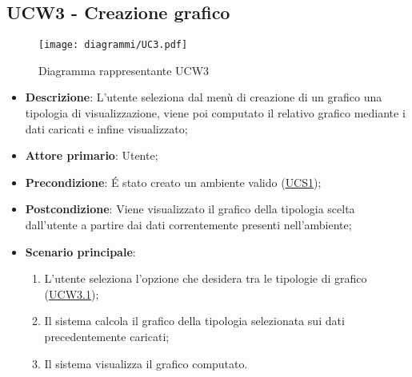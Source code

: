 \subsection{UCW3 - Creazione grafico}
\label{sub:ucw3}

\begin{figure}[h]
	\centering
	\texttt{[image: diagrammi/UC3.pdf]}
	\caption{Diagramma rappresentante UCW3}
	\label{fig:UCW3}
\end{figure}


\begin{itemize}
	\item \textbf{Descrizione}: L’utente seleziona dal menù di creazione di un grafico una tipologia di
	      visualizzazione, viene poi computato il relativo grafico mediante i dati caricati e infine visualizzato;

	\item \textbf{Attore primario}: Utente;

	\item \textbf{Precondizione}: É stato creato un ambiente valido (\hyperref[sub:ucs1]{UCS1});

	\item \textbf{Postcondizione}:  Viene visualizzato il grafico della tipologia scelta dall'utente a partire dai dati
	      correntemente presenti nell'ambiente;

	\item \textbf{Scenario principale}:
	      \begin{enumerate}
		      \item L'utente seleziona l'opzione che desidera tra le tipologie di grafico (\hyperref[ssub:ucw3.1]{UCW3.1});
		      \item Il sistema calcola il grafico della tipologia selezionata sui dati precedentemente caricati;
		      \item Il sistema visualizza il grafico computato.
	      \end{enumerate}
\end{itemize}

